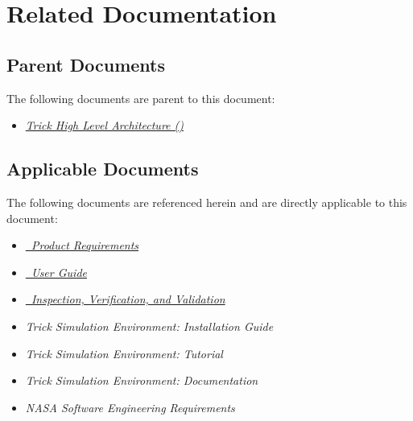 %
%
%

\chapter{Related Documentation}\label{sec:docs}

\section{Parent Documents}
The following documents are parent to this document:

\begin{itemize}
\item{\href{file:\TRICKHLAHOME/docs/TrickHLA.pdf}
           {\em Trick High Level Architecture (\TrickHLA)}}
\cite{trickhlaenv:TrickHLA}
\end{itemize}

\section{Applicable Documents}
The following documents are referenced herein and are directly
applicable to this document:

\begin{itemize}
\item{\href{file:TrickHLAReqt.pdf}
           {\em \TrickHLA\ Product Requirements}}
\cite{trickhlaenv:TrickHLAReqt}

\item{\href{file:TrickHLAUser.pdf}
           {\em \TrickHLA\ User Guide}}
\cite{trickhlaenv:TrickHLAUser}

\item{\href{file:TrickHLAIVV.pdf}
           {\em \TrickHLA\ Inspection, Verification, and Validation}}
\cite{trickhlaenv:TrickHLAIVV}

\item{\em Trick Simulation Environment: Installation Guide}
\cite{Trick:Install}

\item{\em Trick Simulation Environment: Tutorial}
\cite{Trick:Tutorial}

\item{\em Trick Simulation Environment: Documentation}
\cite{Trick:Documentation}

\item{\em NASA Software Engineering Requirements}
\cite{NASA:SWE}
\end{itemize}

